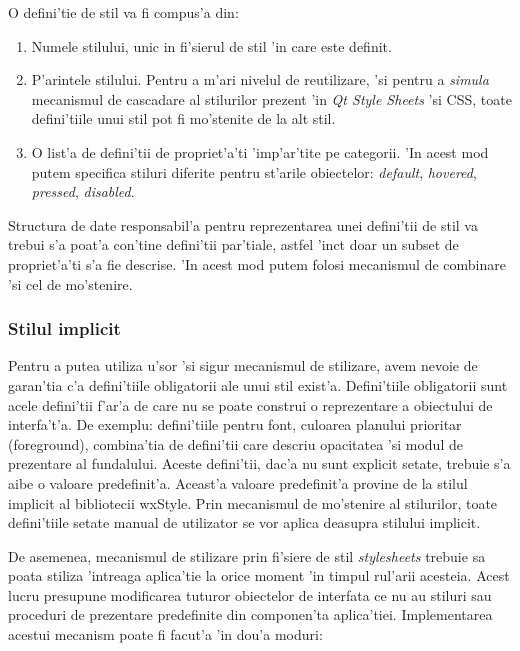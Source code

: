 O defini'tie de stil va fi compus'a din:
\begin{enumerate}
\item Numele stilului, unic in fi'sierul de stil 'in care este definit.
\item P'arintele stilului. Pentru a m'ari nivelul de reutilizare, 'si pentru a \emph{simula} mecanismul de cascadare al stilurilor prezent 'in \emph{Qt Style Sheets} 'si CSS, toate defini'tiile unui stil pot fi mo'stenite de la alt stil.
\item O list'a de defini'tii de propriet'a'ti 'imp'ar'tite pe categorii. 'In acest mod putem specifica stiluri diferite pentru st'arile obiectelor: \emph{default}, \emph{hovered}, \emph{pressed}, \emph{disabled}.
\end{enumerate}

Structura de date responsabil'a pentru reprezentarea unei defini'tii de stil va trebui s'a poat'a con'tine defini'tii par'tiale, astfel 'inc{\ia}t doar un subset de propriet'a'ti s'a fie descrise. 'In acest mod putem folosi mecanismul de combinare 'si cel de mo'stenire.

\subsubsection{Stilul implicit}
Pentru a putea utiliza u'sor 'si sigur mecanismul de stilizare, avem nevoie de garan'tia c'a defini'tiile obligatorii ale unui stil exist'a. Defini'tiile obligatorii sunt acele defini'tii f'ar'a de care nu se poate construi o reprezentare a obiectului de interfa't'a. De exemplu: defini'tiile pentru font, culoarea planului prioritar (foreground), combina'tia de defini'tii care descriu opacitatea 'si modul de prezentare al fundalului. Aceste defini'tii, dac'a nu sunt explicit setate, trebuie s'a aibe o valoare predefinit'a. Aceast'a valoare predefinit'a provine de la stilul implicit al bibliotecii wxStyle. Prin mecanismul de mo'stenire al stilurilor, toate defini'tiile setate manual de utilizator se vor aplica deasupra stilului implicit. 

\medskip

De asemenea, mecanismul de stilizare prin fi'siere de stil \emph{stylesheets} trebuie sa poata stiliza 'intreaga aplica'tie la orice moment 'in timpul rul'arii acesteia. Acest lucru presupune modificarea tuturor obiectelor de interfata ce nu au stiluri sau proceduri de prezentare predefinite din componen'ta aplica'tiei. Implementarea acestui mecanism poate fi facut'a 'in dou'a moduri:

